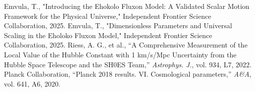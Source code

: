\documentclass[11pt]{article}
\begin{document}
\begin{thebibliography}{9}
\raggedright
{} Emvula, T., "Introducing the Ehokolo Fluxon Model: A Validated Scalar Motion Framework for the Physical Universe," Independent Frontier Science Collaboration, 2025.
 Emvula, T., "Dimensionless Parameters and Universal Scaling in the Eholoko Fluxon Model," Independent Frontier Science Collaboration, 2025.
 Riess, A. G., et al., ``A Comprehensive Measurement of the Local Value of the Hubble Constant with 1 km/s/Mpc Uncertainty from the Hubble Space Telescope and the SH0ES Team,'' \textit{Astrophys. J.}, vol. 934, L7, 2022.
 Planck Collaboration, ``Planck 2018 results. VI. Cosmological parameters,'' \textit{A\&A}, vol. 641, A6, 2020.
\end{thebibliography}
\end{document}

